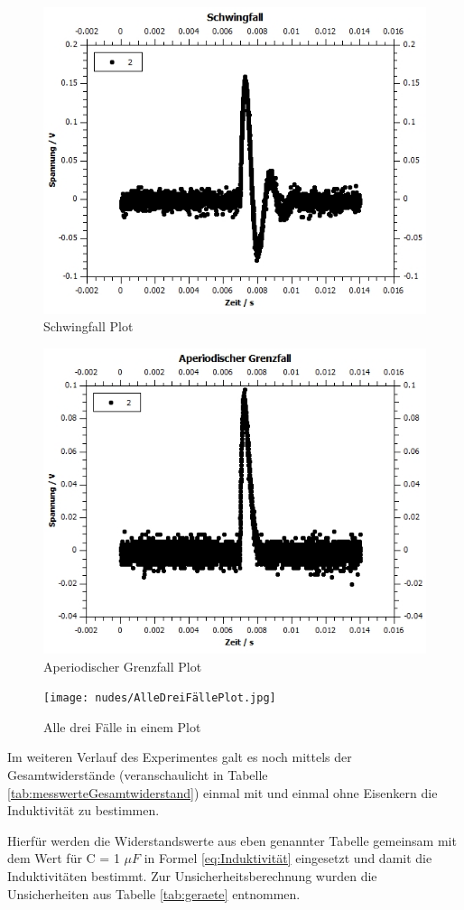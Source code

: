 \documentclass[12pt,a4paper,twoside]{article}
\begin{document}
\begin{figure}[H]
    \centering
    \includegraphics[width=0.6\linewidth, angle=0]{nudes/SchwingfallPlot.jpg}
    \caption{Schwingfall Plot}
    \label{fig:SchwingfallPlot}
\end{figure}

\begin{figure}[H]
    \centering
    \includegraphics[width=0.6\linewidth, angle=0]{nudes/Aperiodischer Grenzfall.jpg}
    \caption{Aperiodischer Grenzfall Plot}
    \label{fig:AperiodischerGrenzfallPlot}
\end{figure}

\begin{figure}[H]
    \centering
    \texttt{[image: nudes/AlleDreiFällePlot.jpg]}
    \caption{Alle drei Fälle in einem Plot}
    \label{fig:AlleDreiFälle}
\end{figure}

\noindent
Im weiteren Verlauf des Experimentes galt es noch mittels der Gesamtwiderstände (veranschaulicht in Tabelle \ref{tab:messwerteGesamtwiderstand}) einmal mit und einmal ohne Eisenkern die Induktivität zu bestimmen. \newline

\noindent
Hierfür werden die Widerstandswerte aus eben genannter Tabelle gemeinsam mit dem Wert für C = 1 $\mu F$ in Formel \ref{eq:Induktivität} eingesetzt und damit die Induktivitäten bestimmt. Zur Unsicherheitsberechnung wurden die Unsicherheiten aus Tabelle \ref{tab:geraete} entnommen.
\end{document}
